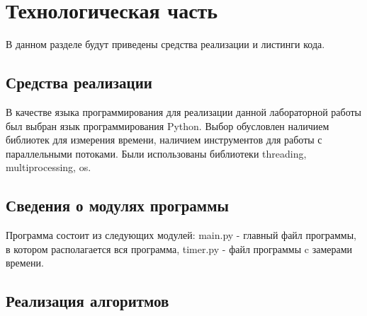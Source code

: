 \chapter{Технологическая часть}

В данном разделе будут приведены средства реализации и листинги кода.


\section{Средства реализации}

В качестве языка программирования для реализации данной лабораторной работы был выбран язык программирования Python. Выбор обусловлен наличием библиотек для измерения времени, наличием инструментов для работы с параллельными потоками. Были использованы библиотеки threading, multiprocessing, os.


\section{Сведения о модулях программы}
Программа состоит из следующих модулей:
main.py - главный файл программы, в котором располагается вся программа,
timer.py - файл программы c замерами времени.


\section{Реализация алгоритмов}

